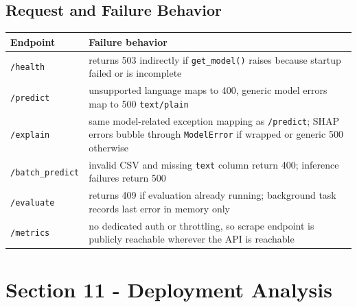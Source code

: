 \subsection{Request and Failure Behavior}
\begin{table}[H]
\centering
\begin{tabularx}{\textwidth}{@{}lX@{}}
\toprule
\textbf{Endpoint} & \textbf{Failure behavior} \\
\midrule
\texttt{/health} & returns 503 indirectly if \texttt{get\_model()} raises because startup failed or is incomplete \\
\texttt{/predict} & unsupported language maps to 400, generic model errors map to 500 \texttt{text/plain} \\
\texttt{/explain} & same model-related exception mapping as \texttt{/predict}; SHAP errors bubble through \texttt{ModelError} if wrapped or generic 500 otherwise \\
\texttt{/batch\_predict} & invalid CSV and missing \texttt{text} column return 400; inference failures return 500 \\
\texttt{/evaluate} & returns 409 if evaluation already running; background task records last error in memory only \\
\texttt{/metrics} & no dedicated auth or throttling, so scrape endpoint is publicly reachable wherever the API is reachable \\
\bottomrule
\end{tabularx}
\end{table}

\section{Section 11 - Deployment Analysis}
